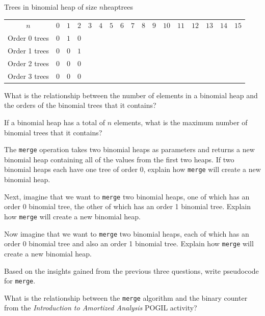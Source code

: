 \documentclass{tufte-handout}
\begin{document}
\begin{questions}
\begin{model*}{Trees in binomial heap of size $n$}{heaptrees}
  \centering
  \begin{tabular}{c|cccccccccccccccc}
    $n$ & $0$ & $1$ & $2$ & $3$ & $4$ & $5$ & $6$ & $7$ & $8$ & $9$ & $10$
    & $11$ & $12$ & $13$ & $14$ & $15$  \\[8pt]
    Order 0 trees & $0$ & $1$ & $0$ & & & & & & & & & & & & & \\[8pt]
    Order 1 trees & $0$ & $0$ & $1$ & & & & & & & & & & & & & \\[8pt]
    Order 2 trees & $0$ & $0$ & $0$ & & & & & & & & & & & & & \\[8pt]
    Order 3 trees & $0$ & $0$ & $0$ & & & & & & & & & & & & & \\[8pt]
  \end{tabular}
  \label{heaptrees}
\end{model*}

\item What is the relationship between the number of elements in a binomial heap and the orders of the binomial trees that it contains?

\item If a binomial heap has a total of $n$ elements, what is the maximum number of binomial trees that it contains? 

\item The \verb|merge| operation takes two binomial heaps as parameters and returns a new binomial heap containing all of the values from the first two heaps. If two binomial heaps each have one tree of order 0, explain how \verb|merge| will create a new binomial heap.

\item Next, imagine that we want to \verb|merge| two binomial heaps, one of which has an order 0 binomial tree, the other of which has an order 1 binomial tree. Explain how \verb|merge| will create a new binomial heap.

\item Now imagine that we want to \verb|merge| two binomial heaps, each of which has an order 0 binomial tree and also an order 1 binomial tree. Explain how \verb|merge| will create a new binomial heap.

\item Based on the insights gained from the previous three questions, write pseudocode for \verb|merge|.

\item What is the relationship between the \verb|merge| algorithm and the binary counter from the \emph{Introduction to Amortized Analysis} POGIL activity? \label{counter}


\end{questions}
\end{document}
